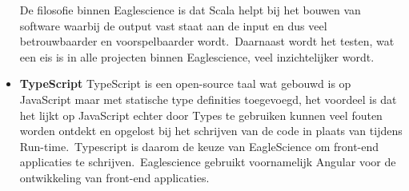 \begin{itemize}
De filosofie binnen Eaglescience is dat Scala helpt bij het bouwen van software waarbij de output vast staat aan de input en dus veel betrouwbaarder en voorspelbaarder wordt.\ Daarnaast wordt het testen, wat een eis is in alle projecten binnen Eaglescience, veel inzichtelijker wordt.

\item \textbf{TypeScript} TypeScript is een open-source taal wat gebouwd is op JavaScript maar met statische type definities toegevoegd, het voordeel is dat het lijkt op JavaScript echter door Types te gebruiken kunnen veel fouten worden ontdekt en opgelost bij het schrijven van de code in plaats van tijdens Run-time.\ Typescript is daarom de keuze van EagleScience om front-end applicaties te schrijven.\ Eaglescience gebruikt voornamelijk Angular voor de ontwikkeling van front-end applicaties.
\end{itemize}


